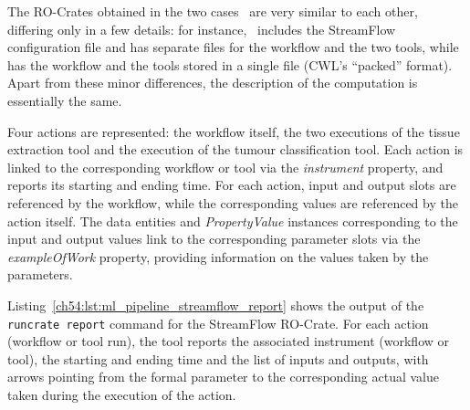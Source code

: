 The RO-Crates obtained in the two cases~\cite{Colonnelli 2023a,Leo 2023}
are very similar to each other, differing only in a few details: for instance,~\cite{Colonnelli 2023a} includes the StreamFlow configuration file and has separate files for the workflow and the two tools, while
\cite{Leo 2023} has the workflow and the tools stored in a single file (CWL's ``packed'' format).
Apart from these minor differences, the description of the computation is essentially the same.

Four actions are represented: the workflow itself, the two executions of the tissue extraction tool and the execution of the tumour classification tool.
Each action is linked to the corresponding workflow or tool via the
\emph{instrument} property, and reports its starting and ending time. For each action, input and output slots are referenced by the workflow, while the corresponding values are referenced by the action itself.
The data entities and \emph{PropertyValue} instances corresponding to the input and output values link to the corresponding parameter slots via the \emph{exampleOfWork} property, providing information on the values taken by the parameters.

Listing~\vref{ch54:lst:ml_pipeline_streamflow_report} shows the output of the
\texttt{runcrate report} command for the StreamFlow RO-Crate. 
For each action (workflow or tool run), the tool reports the associated instrument (workflow or tool), the starting and ending time and the list of inputs and outputs, with arrows pointing from the formal parameter to the corresponding actual value taken during the execution of the action.

